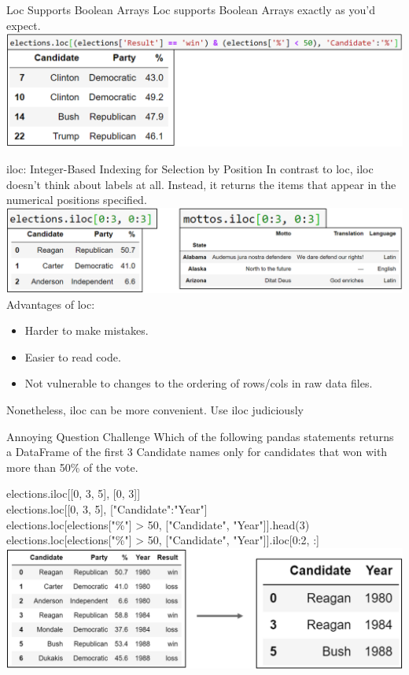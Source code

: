 \documentclass[aspectratio=169]{../latex_main/tntbeamer}  %
\begin{document}
	
	\begin{frame}{Loc Supports Boolean Arrays}
	   Loc supports Boolean Arrays exactly as you’d expect.
	    \includegraphics[scale=.4]{Bild31}
	\end{frame}
	
	
	\begin{frame}{iloc: Integer-Based Indexing for Selection by Position}
	   In contrast to loc, iloc doesn’t think about labels at all. Instead, it returns the items that appear in the numerical positions specified.
	    \includegraphics[scale=.4]{Bild32}
	    Advantages of loc:
	    \begin{itemize}
	        \item Harder to make mistakes.
	        \item Easier to read code.
	        \item Not vulnerable to changes to the ordering of rows/cols in raw data files.
	    \end{itemize}
	    Nonetheless, iloc can be more convenient. Use iloc judiciously
	\end{frame}
	
	
	\begin{frame}{Annoying Question Challenge }
	   Which of the following pandas statements returns a DataFrame of the first 3 Candidate names only for candidates that won with more than 50\% of the vote.
	   
	   elections.iloc[[0, 3, 5], [0, 3]]\\
       elections.loc[[0, 3, 5], ["Candidate":"Year"]\\
       elections.loc[elections["\%"] > 50, ["Candidate", "Year"]].head(3)\\
       elections.loc[elections["\%"] > 50, ["Candidate", "Year"]].iloc[0:2, :]\\

	    \includegraphics[scale=.4]{Bild33}
	\end{frame}
	
\end{document}
